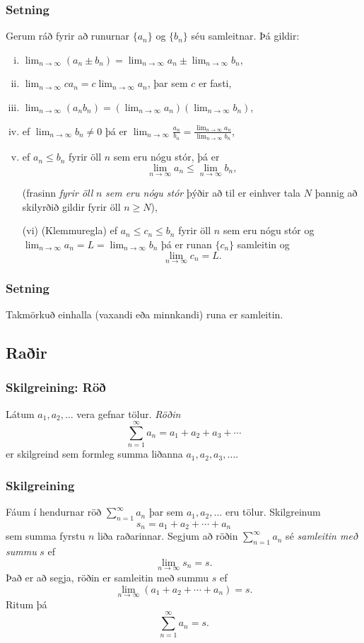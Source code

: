 \documentclass[icelandic,a4paper,12pt]{article}
\begin{document}
\subsubsection{Setning}
Gerum ráð fyrir að runurnar $\{a_n\}$ og $\{b_n\}$ séu samleitnar.  Þá gildir:
\begin{enumerate}[(i)]
\item $\lim_{n\rightarrow\infty}(a_n\pm b_n)=
\lim_{n\rightarrow\infty}a_n\pm\lim_{n\rightarrow\infty}b_n$,
\item $\lim_{n\rightarrow\infty}ca_n=
c\lim_{n\rightarrow\infty}a_n$, þar sem $c$ er fasti,
\item $\lim_{n\rightarrow\infty}(a_n b_n)=
(\lim_{n\rightarrow\infty}a_n)(\lim_{n\rightarrow\infty}b_n)$,
\item ef $\lim_{n\rightarrow\infty}b_n\neq 0$ þá er
$\lim_{n\rightarrow\infty}\frac{a_n}{b_n}=
\frac{\lim_{n\rightarrow\infty}a_n}{\lim_{n\rightarrow\infty}b_n}$,
\item ef $a_n\leq b_n$ fyrir öll $n$ sem eru nógu stór, þá er 
$$\lim_{n\rightarrow\infty}a_n\leq\lim_{n\rightarrow\infty}b_n,$$

(frasinn \emph{fyrir öll} $n$ \emph{sem eru nógu stór} þýðir að til er 
einhver tala $N$ þannig að skilyrðið gildir fyrir öll $n\geq N$),
\item[(vi)]  (Klemmuregla)
ef $a_n\leq c_n\leq b_n$ fyrir öll $n$ sem eru nógu stór og 
$\lim_{n\rightarrow\infty}a_n=L=\lim_{n\rightarrow\infty}b_n$ þá er
runan $\{c_n\}$ samleitin og $$\lim_{n\rightarrow\infty}c_n=L.$$
\end{enumerate}

\subsubsection{Setning} 
Takmörkuð einhalla (vaxandi eða minnkandi) runa er samleitin. 

\subsection{Raðir}
\subsubsection{Skilgreining: Röð}
Látum $a_1, a_2, \ldots$ vera gefnar tölur. 
\emph{Röðin}
$$\sum_{n=1}^\infty a_n  = a_1+a_2+a_3+\cdots$$
er skilgreind sem formleg summa liðanna $a_1, a_2, a_3, \ldots$.

\subsubsection{Skilgreining} 
Fáum í hendurnar röð  $\sum_{n=1}^\infty a_n$ þar sem $a_1, a_2, \ldots$ eru tölur.  
Skilgreinum 
$$
  s_n=a_1+a_2+\cdots+a_n
$$ 
sem summa fyrstu $n$ liða raðarinnar. Segjum að röðin 
$\sum_{n=1}^\infty a_n$ sé \emph{samleitin með summu} $s$ ef 
$$\lim_{n\rightarrow\infty}s_n=s.$$ 
Það er að segja, röðin er samleitin með summu $s$ ef
$$\lim_{n\rightarrow \infty}(a_1+a_2+\cdots+a_n)=s.$$ 
Ritum þá $$\sum_{n=1}^\infty a_n=s.$$
\end{document}
